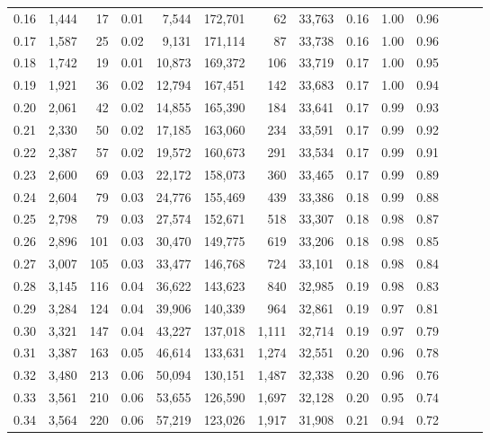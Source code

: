 \begin{tabular}{rrrrrrrrrrrrrr}
0.16 &  1,444 &   17 &  0.01 &    7,544 &  172,701 &      62 &  33,763 &  0.16 &  1.00 &      0.96 \\
0.17 &  1,587 &   25 &  0.02 &    9,131 &  171,114 &      87 &  33,738 &  0.16 &  1.00 &      0.96 \\
0.18 &  1,742 &   19 &  0.01 &   10,873 &  169,372 &     106 &  33,719 &  0.17 &  1.00 &      0.95 \\
0.19 &  1,921 &   36 &  0.02 &   12,794 &  167,451 &     142 &  33,683 &  0.17 &  1.00 &      0.94 \\
0.20 &  2,061 &   42 &  0.02 &   14,855 &  165,390 &     184 &  33,641 &  0.17 &  0.99 &      0.93 \\
0.21 &  2,330 &   50 &  0.02 &   17,185 &  163,060 &     234 &  33,591 &  0.17 &  0.99 &      0.92 \\
0.22 &  2,387 &   57 &  0.02 &   19,572 &  160,673 &     291 &  33,534 &  0.17 &  0.99 &      0.91 \\
0.23 &  2,600 &   69 &  0.03 &   22,172 &  158,073 &     360 &  33,465 &  0.17 &  0.99 &      0.89 \\
0.24 &  2,604 &   79 &  0.03 &   24,776 &  155,469 &     439 &  33,386 &  0.18 &  0.99 &      0.88 \\
0.25 &  2,798 &   79 &  0.03 &   27,574 &  152,671 &     518 &  33,307 &  0.18 &  0.98 &      0.87 \\
0.26 &  2,896 &  101 &  0.03 &   30,470 &  149,775 &     619 &  33,206 &  0.18 &  0.98 &      0.85 \\
0.27 &  3,007 &  105 &  0.03 &   33,477 &  146,768 &     724 &  33,101 &  0.18 &  0.98 &      0.84 \\
0.28 &  3,145 &  116 &  0.04 &   36,622 &  143,623 &     840 &  32,985 &  0.19 &  0.98 &      0.83 \\
0.29 &  3,284 &  124 &  0.04 &   39,906 &  140,339 &     964 &  32,861 &  0.19 &  0.97 &      0.81 \\
0.30 &  3,321 &  147 &  0.04 &   43,227 &  137,018 &   1,111 &  32,714 &  0.19 &  0.97 &      0.79 \\
0.31 &  3,387 &  163 &  0.05 &   46,614 &  133,631 &   1,274 &  32,551 &  0.20 &  0.96 &      0.78 \\
0.32 &  3,480 &  213 &  0.06 &   50,094 &  130,151 &   1,487 &  32,338 &  0.20 &  0.96 &      0.76 \\
0.33 &  3,561 &  210 &  0.06 &   53,655 &  126,590 &   1,697 &  32,128 &  0.20 &  0.95 &      0.74 \\
0.34 &  3,564 &  220 &  0.06 &   57,219 &  123,026 &   1,917 &  31,908 &  0.21 &  0.94 &      0.72 \\

\end{tabular}
